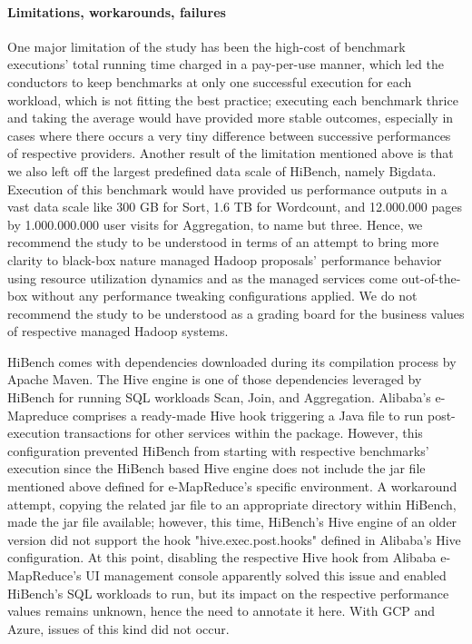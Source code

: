 \documentclass[review]{elsarticle}
\begin{document}
\paragraph{Limitations, workarounds, failures}One major limitation of the study has been the high-cost of benchmark executions' total running time charged in a pay-per-use manner, which led the conductors to keep benchmarks at only one successful execution for each workload, which is not fitting the best practice; executing each benchmark thrice and taking the average would have provided more stable outcomes, especially in cases where there occurs a very tiny difference between successive performances of respective providers. Another result of the  limitation mentioned above is that we also left off the largest predefined data scale of HiBench, namely Bigdata. Execution of this benchmark would have provided us performance outputs in a vast data scale like 300 GB for Sort, 1.6 TB for Wordcount, and 12.000.000 pages by 1.000.000.000 user visits for Aggregation, to name but three. Hence, we recommend the study to be understood in terms of an attempt to bring more clarity to black-box nature managed Hadoop proposals' performance behavior using resource utilization dynamics and as the managed services come out-of-the-box without any performance tweaking configurations applied. We do not recommend the study to be understood as a grading board for the business values of respective managed Hadoop systems.

HiBench comes with dependencies downloaded during its compilation process by Apache Maven. The Hive engine is one of those dependencies leveraged by HiBench for running SQL workloads Scan, Join, and Aggregation. Alibaba's e-Mapreduce comprises a ready-made Hive hook triggering a Java file to run post-execution transactions for other services within the package. However, this configuration prevented HiBench from starting with respective benchmarks' execution since the HiBench based Hive engine does not include the jar file mentioned above defined for e-MapReduce's specific environment. A workaround attempt, copying the related jar file to an appropriate directory within HiBench, made the jar file available; however, this time, HiBench's Hive engine of an older version did not support the hook "hive.exec.post.hooks" defined in Alibaba's Hive configuration. At this point, disabling the respective Hive hook from Alibaba e-MapReduce's UI management console apparently solved this issue and enabled HiBench's SQL workloads to run, but its impact on the respective performance values remains unknown, hence the need to annotate it here. With GCP and Azure, issues of this kind did not occur.
\end{document}
